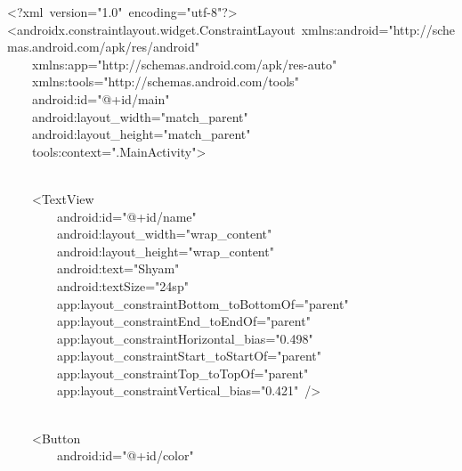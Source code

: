 {\ttfamily\small \textless{}?xml\ version="1.0"\ encoding="utf-8"?\textgreater{}} \\
{\ttfamily\small \textless{}androidx.constraintlayout.widget.ConstraintLayout\ xmlns:android="http://schemas.android.com/apk/res/android"} \\
{\ttfamily\small \ \ \ \ xmlns:app="http://schemas.android.com/apk/res-auto"} \\
{\ttfamily\small \ \ \ \ xmlns:tools="http://schemas.android.com/tools"} \\
{\ttfamily\small \ \ \ \ android:id="@+id/main"} \\
{\ttfamily\small \ \ \ \ android:layout\_width="match\_parent"} \\
{\ttfamily\small \ \ \ \ android:layout\_height="match\_parent"} \\
{\ttfamily\small \ \ \ \ tools:context=".MainActivity"\textgreater{}} \\
\strut \\
{\ttfamily\small \ \ \ \ \textless{}TextView} \\
{\ttfamily\small \ \ \ \ \ \ \ \ android:id="@+id/name"} \\
{\ttfamily\small \ \ \ \ \ \ \ \ android:layout\_width="wrap\_content"} \\
{\ttfamily\small \ \ \ \ \ \ \ \ android:layout\_height="wrap\_content"} \\
{\ttfamily\small \ \ \ \ \ \ \ \ android:text="Shyam"} \\
{\ttfamily\small \ \ \ \ \ \ \ \ android:textSize="24sp"} \\
{\ttfamily\small \ \ \ \ \ \ \ \ app:layout\_constraintBottom\_toBottomOf="parent"} \\
{\ttfamily\small \ \ \ \ \ \ \ \ app:layout\_constraintEnd\_toEndOf="parent"} \\
{\ttfamily\small \ \ \ \ \ \ \ \ app:layout\_constraintHorizontal\_bias="0.498"} \\
{\ttfamily\small \ \ \ \ \ \ \ \ app:layout\_constraintStart\_toStartOf="parent"} \\
{\ttfamily\small \ \ \ \ \ \ \ \ app:layout\_constraintTop\_toTopOf="parent"} \\
{\ttfamily\small \ \ \ \ \ \ \ \ app:layout\_constraintVertical\_bias="0.421"\ /\textgreater{}} \\
\strut \\
{\ttfamily\small \ \ \ \ \textless{}Button} \\
{\ttfamily\small \ \ \ \ \ \ \ \ android:id="@+id/color"} \\
